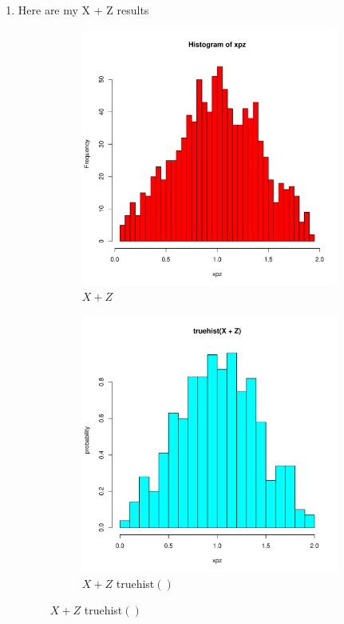 \documentclass[letterpaper]{article}
\begin{document}
\begin{enumerate}
\begin{enumerate}
\item Here are my X + Z results

\begin{figure}
    \centering
    \begin{subfigure}{0.4\textwidth}
        \centering
        \includegraphics[width=\textwidth]{hw1-q2c-xpz.pdf}
        \caption{$X + Z$}
    \end{subfigure}
    \begin{subfigure}{0.4\textwidth}
        \centering
        \includegraphics[width=\textwidth]{hw1q2d-truehist.pdf}
        \caption{$X + Z$ truehist$()$}
    \end{subfigure}
\end{figure}


\end{enumerate}
\end{enumerate}
\end{document}
